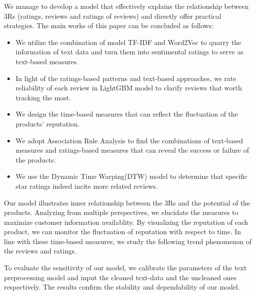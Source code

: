 \documentclass[12pt]{article}%
\begin{document}
We manage to develop a model that effectively explains the relationship between 3Rs (ratings, reviews and ratings of reviews) and directly offer practical strategies. The main works of this paper can be concluded as follows:
\begin{itemize} 
	\item  We utilize the combination of model TF-IDF and Word2Vec to quarry the information of text data and turn them into sentimental ratings to serve as text-based measures. 
	\item  In light of the ratings-based patterns and text-based approaches, we rate reliability of each review in LightGBM model to clarify reviews that worth tracking the most.
	\item  We design the time-based measures that can reflect the fluctuation of the products’ reputation. 
	\item  We adopt Association Rule Analysis to find the combinations of text-based measures and ratings-based measures that can reveal the success or failure of the products.
	\item We use the Dynamic Time Warping(DTW) model to determine that specific star ratings indeed incite more related reviews.
\end{itemize}

Our model illustrates inner relationship between the 3Rs and the potential of the products. Analyzing from multiple perspectives, we elucidate the measures to maximize customer information availablity. By visualizing the reputation of each product, we can monitor the
fluctuation of reputation with respect to time. In line with these time-based measures, we study the following trend phenomenon of the reviews and ratings.

To evaluate the sensitivity of our model, we calibrate the parameters of the text preprocessing model and input the cleaned text-data and the uncleaned ones respectively. The results confirm the stability and dependability of our model.
\end{document}
